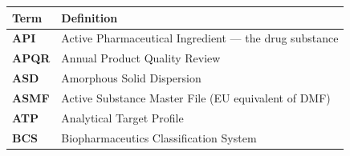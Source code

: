 \documentclass[
  11pt,
  a4paper,
]{report}
\begin{document}
\begin{longtable}[]{@{}ll@{}}
\toprule
\begin{minipage}[b]{0.33\columnwidth}\raggedright
Term\strut
\end{minipage} & \begin{minipage}[b]{0.61\columnwidth}\raggedright
Definition\strut
\end{minipage}\tabularnewline
\midrule
\endhead
\begin{minipage}[t]{0.33\columnwidth}\raggedright
\textbf{API}\strut
\end{minipage} & \begin{minipage}[t]{0.61\columnwidth}\raggedright
Active Pharmaceutical Ingredient --- the drug substance\strut
\end{minipage}\tabularnewline
\begin{minipage}[t]{0.33\columnwidth}\raggedright
\textbf{APQR}\strut
\end{minipage} & \begin{minipage}[t]{0.61\columnwidth}\raggedright
Annual Product Quality Review\strut
\end{minipage}\tabularnewline
\begin{minipage}[t]{0.33\columnwidth}\raggedright
\textbf{ASD}\strut
\end{minipage} & \begin{minipage}[t]{0.61\columnwidth}\raggedright
Amorphous Solid Dispersion\strut
\end{minipage}\tabularnewline
\begin{minipage}[t]{0.33\columnwidth}\raggedright
\textbf{ASMF}\strut
\end{minipage} & \begin{minipage}[t]{0.61\columnwidth}\raggedright
Active Substance Master File (EU equivalent of DMF)\strut
\end{minipage}\tabularnewline
\begin{minipage}[t]{0.33\columnwidth}\raggedright
\textbf{ATP}\strut
\end{minipage} & \begin{minipage}[t]{0.61\columnwidth}\raggedright
Analytical Target Profile\strut
\end{minipage}\tabularnewline
\begin{minipage}[t]{0.33\columnwidth}\raggedright
\textbf{BCS}\strut
\end{minipage} & \begin{minipage}[t]{0.61\columnwidth}\raggedright
Biopharmaceutics Classification System\strut
\end{minipage}\tabularnewline

\end{longtable}
\end{document}
